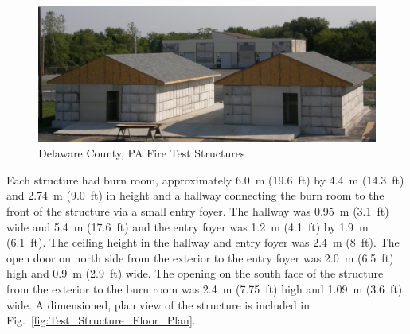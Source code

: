 \documentclass[12pt,oneside]{book}
\begin{document}
\begin{figure}[!ht]
	\includegraphics[width=6in]{../Figures/Pictures/DelCo_Structures}
	\caption{Delaware County, PA Fire Test Structures}
	\label{fig:Delaware_County,_PA_Fire_Test_Structures}
\end{figure}

Each structure had burn room, approximately 6.0~m (19.6~ft) by 4.4~m (14.3~ft) and 2.74~m (9.0~ft) in height and a hallway connecting the burn room to the front of the structure via a small entry foyer. The hallway was 0.95~m (3.1~ft) wide and 5.4~m (17.6~ft) and the entry foyer was 1.2~m (4.1~ft) by 1.9~m (6.1~ft). The ceiling height in the hallway and entry foyer was 2.4~m (8~ft).  The open door on north side from the exterior to the entry foyer was 2.0~m (6.5~ft) high and 0.9~m (2.9~ft) wide.  The opening on the south face of the structure from the exterior to the burn room was 2.4~m (7.75~ft) high and 1.09~m (3.6~ft) wide. A dimensioned, plan view of the structure is included in Fig.~\ref{fig:Test_Structure_Floor_Plan}.    

\end{document}
